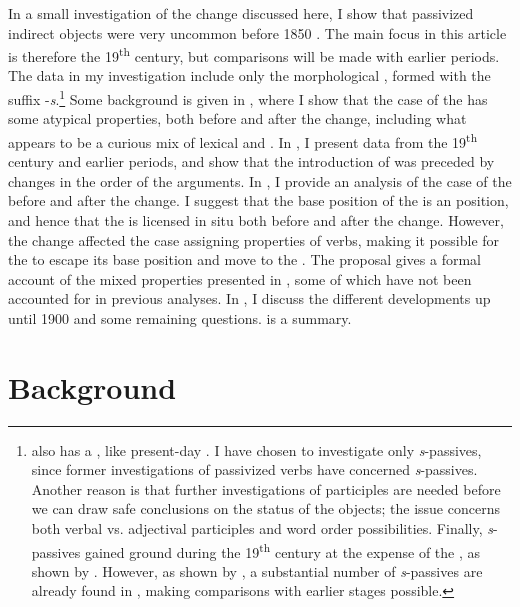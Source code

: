 \documentclass[output=paper]{langscibook}
\begin{document}
In a small investigation of the change discussed here, I show that passivized indirect objects were very uncommon before 1850 \citep[167]{Falk1997}. The main focus in this article is therefore the 19\textsuperscript{th} century, but comparisons will be made with earlier periods. The data in my investigation include only the morphological , formed with the suffix -\textit{s}.\footnote{ also has a , like present-day . I have chosen to investigate only \textit{s}{}-passives, since former investigations of passivized  verbs have concerned \textit{s}{}-passives. Another reason is that further investigations of participles are needed before we can draw safe conclusions on the status of the objects; the issue concerns both verbal vs. adjectival participles and word order possibilities. Finally, \textit{s}{}-passives gained ground during the 19\textsuperscript{th} century at the expense of the , as shown by \citet{Kirri1975}. However, as shown by \citet{Holm1952}, a substantial number of \textit{s}{}-passives are already found in , making comparisons with earlier stages possible.} Some background is given in , where I show that the case of the  has some atypical properties, both before and after the change, including what appears to be a curious mix of lexical and . In , I present data from the 19\textsuperscript{th} century and earlier periods, and show that the introduction of  was preceded by changes in the order of the arguments. In , I provide an analysis of the case of the  before and after the change. I suggest that the base position of the  is an  position, and hence that the  is licensed in situ both before and after the change. However, the change affected the case assigning properties of  verbs, making it possible for the  to escape its base position and move to the . The proposal gives a formal account of the mixed properties presented in , some of which have not been accounted for in previous analyses. In , I discuss the different developments up until 1900 and some remaining questions.  is a summary.

\section{Background}\label{sec:falk:2}
\end{document}
